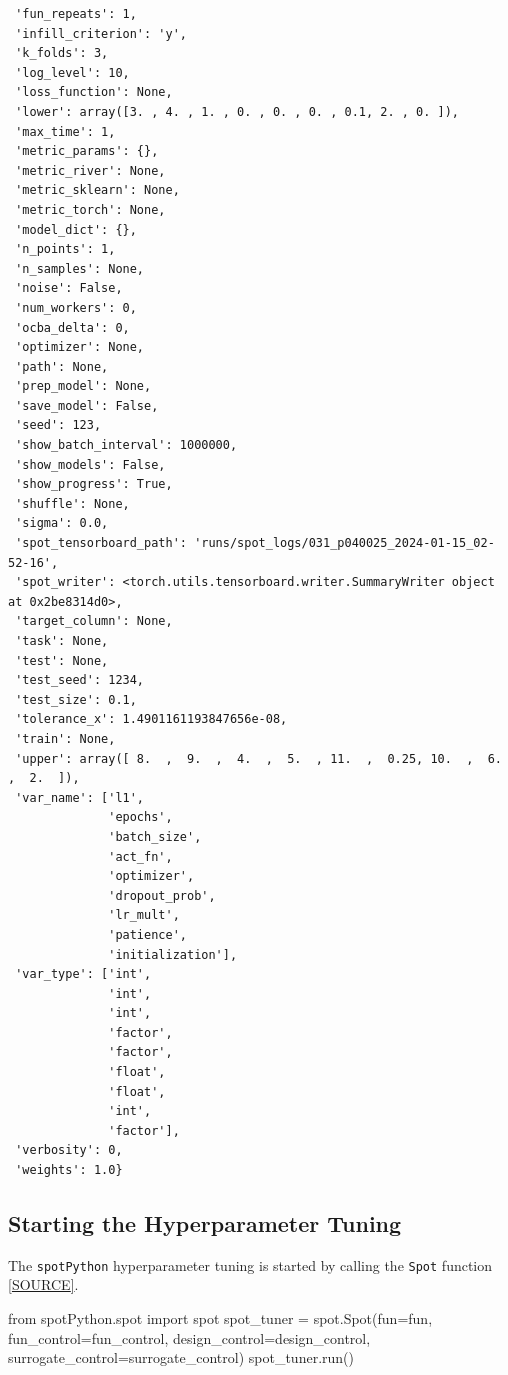 \documentclass[
  letterpaper,
  DIV=11,
  numbers=noendperiod]{scrreprt}
\newenvironment{Shaded}{\begin{snugshade}}{\end{snugshade}}
\newcommand{\ImportTok}[1]{\textcolor[rgb]{0.00,0.46,0.62}{#1}}
\newcommand{\NormalTok}[1]{\textcolor[rgb]{0.00,0.23,0.31}{#1}}
\newcommand{\OperatorTok}[1]{\textcolor[rgb]{0.37,0.37,0.37}{#1}}
\begin{document}
\begin{verbatim}
 'fun_repeats': 1,
 'infill_criterion': 'y',
 'k_folds': 3,
 'log_level': 10,
 'loss_function': None,
 'lower': array([3. , 4. , 1. , 0. , 0. , 0. , 0.1, 2. , 0. ]),
 'max_time': 1,
 'metric_params': {},
 'metric_river': None,
 'metric_sklearn': None,
 'metric_torch': None,
 'model_dict': {},
 'n_points': 1,
 'n_samples': None,
 'noise': False,
 'num_workers': 0,
 'ocba_delta': 0,
 'optimizer': None,
 'path': None,
 'prep_model': None,
 'save_model': False,
 'seed': 123,
 'show_batch_interval': 1000000,
 'show_models': False,
 'show_progress': True,
 'shuffle': None,
 'sigma': 0.0,
 'spot_tensorboard_path': 'runs/spot_logs/031_p040025_2024-01-15_02-52-16',
 'spot_writer': <torch.utils.tensorboard.writer.SummaryWriter object at 0x2be8314d0>,
 'target_column': None,
 'task': None,
 'test': None,
 'test_seed': 1234,
 'test_size': 0.1,
 'tolerance_x': 1.4901161193847656e-08,
 'train': None,
 'upper': array([ 8.  ,  9.  ,  4.  ,  5.  , 11.  ,  0.25, 10.  ,  6.  ,  2.  ]),
 'var_name': ['l1',
              'epochs',
              'batch_size',
              'act_fn',
              'optimizer',
              'dropout_prob',
              'lr_mult',
              'patience',
              'initialization'],
 'var_type': ['int',
              'int',
              'int',
              'factor',
              'factor',
              'float',
              'float',
              'int',
              'factor'],
 'verbosity': 0,
 'weights': 1.0}
\end{verbatim}

\subsection{Starting the Hyperparameter
Tuning}\label{sec-call-the-hyperparameter-tuner-31}

The \texttt{spotPython} hyperparameter tuning is started by calling the
\texttt{Spot} function
\href{https://github.com/sequential-parameter-optimization/spotPython/blob/main/src/spotPython/spot/spot.py}{{[}SOURCE{]}}.

\begin{Shaded}
\begin{Highlighting}[]
\ImportTok{from}\NormalTok{ spotPython.spot }\ImportTok{import}\NormalTok{ spot}
\NormalTok{spot\_tuner }\OperatorTok{=}\NormalTok{ spot.Spot(fun}\OperatorTok{=}\NormalTok{fun,}
\NormalTok{                       fun\_control}\OperatorTok{=}\NormalTok{fun\_control,}
\NormalTok{                       design\_control}\OperatorTok{=}\NormalTok{design\_control,}
\NormalTok{                       surrogate\_control}\OperatorTok{=}\NormalTok{surrogate\_control)}
\NormalTok{spot\_tuner.run()}
\end{Highlighting}
\end{Shaded}
\end{document}
